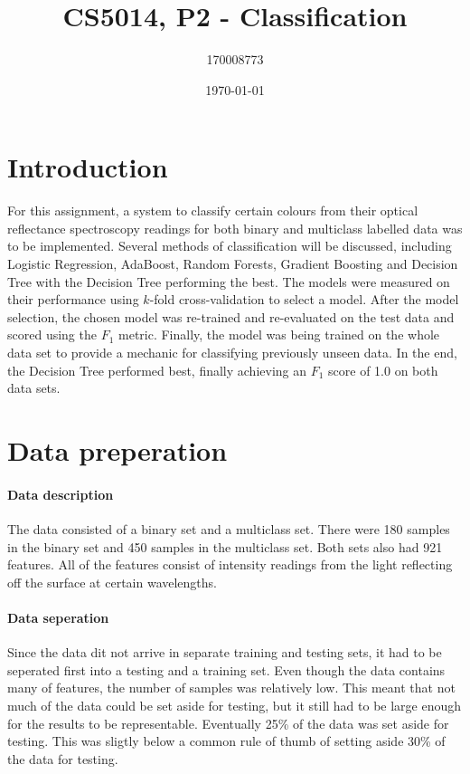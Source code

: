 \documentclass[british]{article}
\title{CS5014, P2 - Classification}
\author{170008773}
\date{\today}
\begin{document}
	\maketitle
	
	\section{Introduction}
	\label{intro}
	For this assignment, a system to classify certain colours from their optical reflectance spectroscopy readings for both binary and multiclass labelled data was to be implemented. Several methods of classification will be discussed, including Logistic Regression, AdaBoost, Random Forests, Gradient Boosting and Decision Tree with the Decision Tree performing the best. The models were measured on their performance using $k$-fold cross-validation to select a model. After the model selection, the chosen model was re-trained and re-evaluated on the test data and scored using the $F_1$ metric. Finally, the model was being trained on the whole data set to provide a mechanic for classifying previously unseen data.  In the end, the Decision Tree performed best, finally achieving an $F_1$ score of 1.0 on both data sets. 
	
	
	\section{Data preperation}
	\paragraph{Data description} The data consisted of a binary set and a multiclass set. There were 180 samples in the binary set and 450 samples in the multiclass set. Both sets also had 921 features. All of the features consist of intensity readings from the light reflecting off the surface at certain wavelengths.   
	
	\paragraph{Data seperation} Since the data dit not arrive in separate training and testing sets, it had to be seperated first into a testing and a training set. Even though the data contains many of features, the number of samples was relatively low. This meant that not much of the data could be set aside for testing, but it still had to be large enough for the results to be representable. Eventually 25\% of the data was set aside for testing. This was sligtly below a common rule of thumb of setting aside 30\% of the data for testing. 
	
\end{document}
